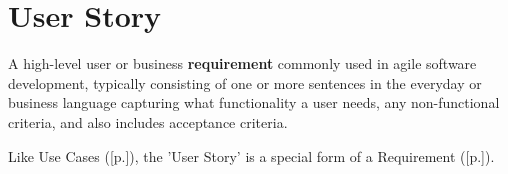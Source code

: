 \section{User Story}
\label{sec:User Story}

A high-level user or business \textbf{requirement} commonly used in agile software development, typically consisting of one or more sentences in the everyday or business language capturing what functionality a user needs, any non-functional criteria, and also includes acceptance criteria.

Like Use Cases ([p.\pageref{sec:Use Case}]), the 'User Story' is a special form of a Requirement ([p.\pageref{sec:Requirement}]).

